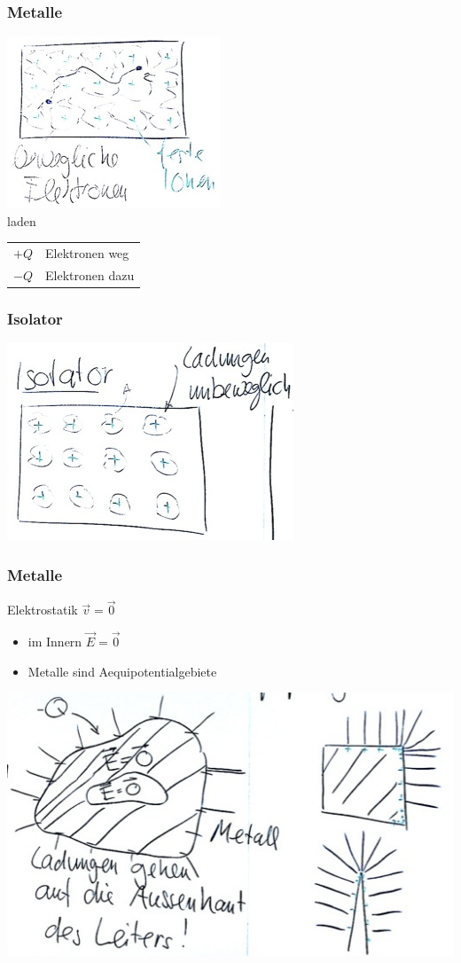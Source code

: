 \subsubsection{Metalle}
\includegraphics{Bild165} \\
laden \\
\begin{tabular}{ l l }
	$+Q$ &Elektronen weg \\
	$-Q$ &Elektronen dazu
\end{tabular}

\subsubsection{Isolator}
\includegraphics{Bild166}

\subsubsection{Metalle}
Elektrostatik $\vec{v} = \vec{0}$
\begin{itemize}[ label = $\implies$ ]
	\item im Innern $\vec{E} = \vec{0}$
	\item Metalle sind Aequipotentialgebiete
\end{itemize}
\includegraphics{Bild167}

